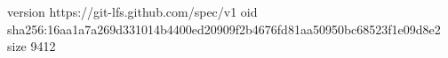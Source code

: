 version https://git-lfs.github.com/spec/v1
oid sha256:16aa1a7a269d331014b4400ed20909f2b4676fd81aa50950bc68523f1e09d8e2
size 9412

